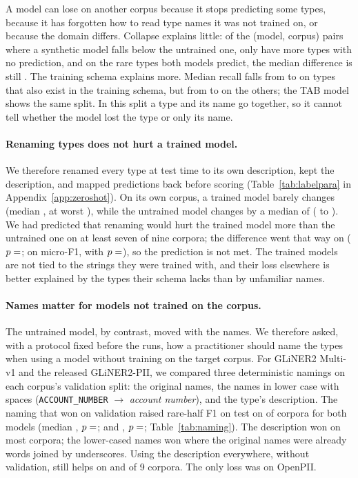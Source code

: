 \documentclass[11pt]{article}
\begin{document}
A model can lose on another corpus because it stops predicting some
types, because it has forgotten how to read type names it was not
trained on, or because the domain differs. Collapse explains little:
of the  (model, corpus) pairs where a synthetic model falls
below the untrained one, only  have more types with no
prediction, and on the rare types both models predict, the median
difference is still . The training schema explains more.
Median recall falls from  to  on
types that also exist in the training schema, but from
 to  on the others; the TAB model
shows the same split. In this split a type and its name go together, so
it cannot tell whether the model lost the type or only its name.

\paragraph{Renaming types does not hurt a trained model.}
We therefore renamed every type at test time to its own description,
kept the description, and mapped predictions back before scoring
(Table~\ref{tab:labelpara} in Appendix~\ref{app:zeroshot}). On its own
corpus, a trained model barely changes (median , at worst
), while the untrained model changes by a median of
 ( to ). We had
predicted that renaming would hurt the trained model more than the
untrained one on at least seven of nine corpora; the difference went
that way on  ($p=\lp{p}$; on micro-F1,  with
$p=\lp{microp}$), so the prediction is not met. The trained models are
not tied to the strings they were trained with, and their loss
elsewhere is better explained by the types their schema lacks than by
unfamiliar names.

\paragraph{Names matter for models not trained on the corpus.}
The untrained model, by contrast, moved with the names. We therefore
asked, with a protocol fixed before the runs, how a practitioner should
name the types when using a model without training on the target corpus.
For GLiNER2 Multi-v1 and the released GLiNER2-PII, we compared three
deterministic namings on each corpus's validation split: the original
names, the names in lower case with spaces (\texttt{ACCOUNT\_NUMBER}
$\to$ \emph{account number}), and the type's description. The naming
that won on validation raised rare-half F1 on test on 
of  corpora for both models (median , $p=\nm{un@p}$;
and , $p=\nm{pii@p}$; Table~\ref{tab:naming}). The
description won on most corpora; the lower-cased names won where the
original names were already words joined by underscores. Using the
description everywhere, without validation, still helps on
 and  of 9 corpora. The
only loss was on OpenPII.
\end{document}
